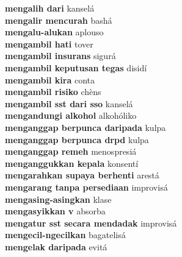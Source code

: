 \textbf{ mengalih dari  } kanselá \\
\textbf{ mengalir mencurah  } bashá \\
\textbf{ mengalu-alukan  } aplouso \\
\textbf{ mengambil hati  } tover \\
\textbf{ mengambil insurans  } sigurá \\
\textbf{ mengambil keputusan tegas  } disidí \\
\textbf{ mengambil kira  } conta \\
\textbf{ mengambil risiko  } chèns \\
\textbf{ mengambil sst dari sso  } kanselá \\
\textbf{ mengandungi alkohol  } alkohóliko \\
\textbf{ menganggap berpunca daripada  } kulpa \\
\textbf{ menganggap berpunca drpd  } kulpa \\
\textbf{ menganggap remeh  } menospresiá \\
\textbf{ menganggukkan kepala  } konsentí \\
\textbf{ mengarahkan supaya berhenti  } arestá \\
\textbf{ mengarang tanpa persediaan  } improvisá \\
\textbf{ mengasing-asingkan  } klase \\
\textbf{ mengasyikkan v  } absorba \\
\textbf{ mengatur sst secara mendadak  } improvisá \\
\textbf{ mengecil-ngecilkan  } bagatelisá \\
\textbf{ mengelak daripada  } evitá \\
